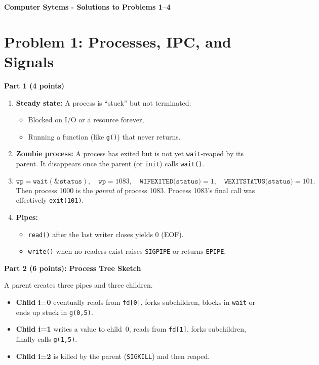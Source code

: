 \documentclass[11pt]{article}
\begin{document}
	
	\begin{center}
		{\Large \textbf{Computer Sytems - Solutions to Problems 1--4}}
	\end{center}
	
	\bigskip
	
	\section*{Problem 1: Processes, IPC, and Signals}
	
	\noindent
	\textbf{Part 1 (4 points)}
	\begin{enumerate}
		\item \textbf{Steady state:} A process is “stuck” but not terminated:
		\begin{itemize}
			\item Blocked on I/O or a resource forever,
			\item Running a function (like \texttt{g()}) that never returns.
		\end{itemize}
		
		\item \textbf{Zombie process:} A process has exited but is not yet \texttt{wait}-reaped by its parent.  It disappears once the parent (or \texttt{init}) calls \texttt{wait()}.
		
		\item
		\[
		\texttt{wp} = \texttt{wait}(\&\texttt{status}),\quad
		\texttt{wp} = 1083,\quad
		\texttt{WIFEXITED(status)}=1,\quad
		\texttt{WEXITSTATUS(status)}=101.
		\]
		Then process 1000 is the \emph{parent} of process 1083.  Process 1083’s final call was effectively \texttt{exit(101)}.
		
		\item \textbf{Pipes:}
		\begin{itemize}
			\item \texttt{read()} after the last writer closes yields 0 (EOF).
			\item \texttt{write()} when no readers exist raises \texttt{SIGPIPE} or returns \texttt{EPIPE}.
		\end{itemize}
	\end{enumerate}
	
	\noindent
	\textbf{Part 2 (6 points): Process Tree Sketch}
	
	\noindent
	A parent creates three pipes and three children. 
	\begin{itemize}
		\item \textbf{Child i=0} eventually reads from \texttt{fd[0]}, forks subchildren, blocks in \texttt{wait} or ends up stuck in \texttt{g(0,5)}.
		\item \textbf{Child i=1} writes a value to child~0, reads from \texttt{fd[1]}, forks subchildren, finally calls \texttt{g(1,5)}.
		\item \textbf{Child i=2} is killed by the parent (\texttt{SIGKILL}) and then reaped.
	\end{itemize}
	
\end{document}
